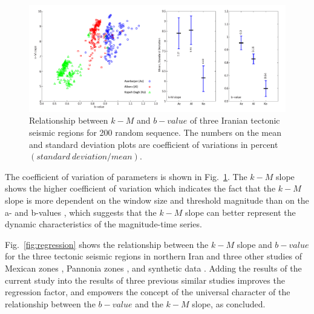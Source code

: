 \begin{figure}[t]
	\centering
	\includegraphics[scale=0.5]{figures/pdf/Figure08.pdf} 
	\caption{ Relationship between $k-M$ and $b-value$ of three Iranian tectonic seismic regions for 200 random sequence. The numbers on the mean and standard deviation plots are coefficient of variations in percent $(standard \ deviation / mean)$.}
	\label{fig:random}
\end{figure}

The coefficient of variation of parameters is shown in Fig.~\ref{fig:random}. The  $k-M$  slope shows the higher coefficient of variation which indicates the fact that the  $k-M$  slope is more dependent on the window size and threshold magnitude than on the a-  and  b-values , which suggests that  the $k-M$  slope can better represent the dynamic characteristics of the magnitude-time series. 

Fig.~\ref{fig:regression} shows the relationship between the  $k-M$  slope and $b-value$ for the three tectonic seismic regions in northern Iran and three other studies of Mexican zones  \citep{Telesca2013}, Pannonia zones  \citep{Telesca2014}, and synthetic data \citep{Telesca2014-pone}. Adding the results of the current study into the results of three previous similar studies improves the regression factor, and empowers the concept of the universal character of the relationship between the  $b-value$  and the  $k-M$  slope, as  \citet{Telesca2014} concluded. 
 

